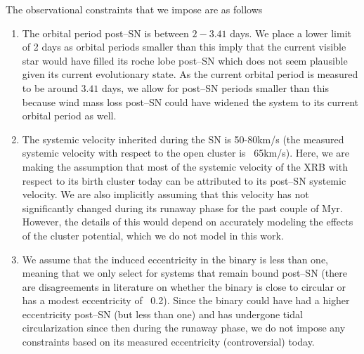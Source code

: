 \documentclass[linenumbers,trackchanges,twocolumn]{aastex701}
\begin{document}
The observational constraints that we impose are as follows 

\begin{enumerate}
        \item The orbital period post--SN is between $2-3.41$ days. We place a lower limit of 2 days as orbital periods smaller than this imply that the current visible star would have filled its roche lobe post--SN which does not seem plausible given its current evolutionary state. As the current orbital period is measured to be around $3.41$ days, we allow for post--SN periods smaller than this because wind mass loss post--SN could have widened the system to its current orbital period as well.
        \item The systemic velocity inherited during the SN is 50-80km/s (the measured systemic velocity with respect to the open cluster is ~65km/s). Here, we are making the assumption that most of the systemic velocity of the XRB with respect to its birth cluster today can be attributed to its post--SN systemic velocity. We are also implicitly assuming that this velocity has not significantly changed during its runaway phase for the past couple of Myr. However, the details of this would depend on accurately modeling the effects of the cluster potential, which we do not model in this work.
        \item We assume that the induced eccentricity in the binary is less than one, meaning that we only select for systems that remain bound post--SN (there are disagreements in literature on whether the binary is close to circular or has a modest eccentricity of ~0.2). Since the binary could have had a higher eccentricity post--SN (but less than one) and has undergone tidal circularization since then during the runaway phase, we do not impose any constraints based on its measured eccentricity (controversial) today.
\end{enumerate}
\end{document}
